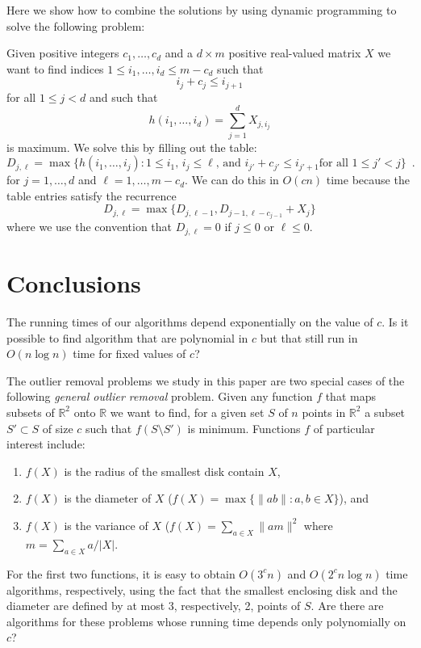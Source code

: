 \documentclass[lotsofwhite]{patmorin}
\begin{document}
Here we show how to combine the solutions by using dynamic programming
to solve the following problem:

Given positive integers $c_1,\ldots,c_d$ and a $d\times m$ positive
real-valued matrix $X$
we want to find indices $1\le i_1,\ldots,i_d \le m-c_d$ such that 
\[ 
    i_j + c_j \le i_{j+1} 
\] 
for all $1\le j < d$ and such that
\[
      h(i_1,\ldots,i_d)=\sum_{j=1}^d X_{j,i_j}
\]
is maximum.  We solve this by filling out the table:
\[
     D_{j,\ell} = \max\{h(i_1,\ldots,i_j): 
      \mbox{$1\le i_1$, $i_j\le \ell$, and $i_{j'}+c_{j'}\le i_{j'+1}$
             for all $1\le j'< j$}  \} \enspace .
\]
for $j=1,\ldots,d$ and $\ell=1,\ldots,m-c_d$.  We can do this in
$O(cn)$ time because the table entries satisfy the recurrence
\[
     D_{j,\ell} = \max\{D_{j,\ell-1},D_{j-1,\ell-c_{j-1}}+X_j \}
\]
where we use the convention that $D_{j,\ell} = 0$ if $j\le 0$ or
$\ell\le 0$.


\section{Conclusions}

The running times of our algorithms depend exponentially on the value
of $c$.  Is it possible to find algorithm that are polynomial in $c$
but that still run in $O(n\log n)$ time for fixed values of $c$?

The outlier removal problems we study in this paper are two special
cases of the following \emph{general outlier removal} problem.  Given
any function $f$ that maps subsets of $\mathbb{R}^2$ onto $\mathbb{R}$
we want to find, for a given set $S$ of $n$ points in $\mathbb{R}^2$ a
subset $S'\subset S$ of size $c$ such that $f(S\setminus S')$ is
minimum.  Functions $f$ of particular interest include:
\begin{enumerate}
\item $f(X)$ is the radius of the smallest disk contain $X$,
\item $f(X)$ is the diameter of $X$ ($f(X)=\max\{\|ab\|:a,b\in X\}$), and
\item $f(X)$ is the variance of $X$ ($f(X)=\sum_{a\in X} \| am \|^2$
where $m=\sum_{a\in X} a/|X|$.
\end{enumerate}
For the first two functions, it is easy to obtain $O(3^c n)$ and
$O(2^cn\log n)$ time algorithms, respectively, using the fact that the
smallest enclosing disk and the diameter are defined by at most 3,
respectively, 2, points of $S$.  Are there are algorithms for these
problems whose running time depends only polynomially on $c$?
\end{document}
